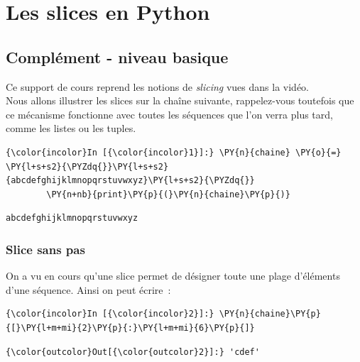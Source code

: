     \hypertarget{les-slices-en-python}{%
\section{Les slices en Python}\label{les-slices-en-python}}

    \hypertarget{compluxe9ment---niveau-basique}{%
\subsection{Complément - niveau
basique}\label{compluxe9ment---niveau-basique}}

    Ce support de cours reprend les notions de \emph{slicing} vues dans la
vidéo.\\

    Nous allons illustrer les slices sur la chaîne suivante, rappelez-vous
toutefois que ce mécanisme fonctionne avec toutes les séquences que l'on
verra plus tard, comme les listes ou les tuples.

    \begin{Verbatim}[commandchars=\\\{\}]
{\color{incolor}In [{\color{incolor}1}]:} \PY{n}{chaine} \PY{o}{=} \PY{l+s+s2}{\PYZdq{}}\PY{l+s+s2}{abcdefghijklmnopqrstuvwxyz}\PY{l+s+s2}{\PYZdq{}}
        \PY{n+nb}{print}\PY{p}{(}\PY{n}{chaine}\PY{p}{)}
\end{Verbatim}


    \begin{Verbatim}[commandchars=\\\{\}]
abcdefghijklmnopqrstuvwxyz
    \end{Verbatim}

    \hypertarget{slice-sans-pas}{%
\subsubsection{Slice sans pas}\label{slice-sans-pas}}

    On a vu en cours qu'une slice permet de désigner toute une plage
d'éléments d'une séquence. Ainsi on peut écrire~:

    \begin{Verbatim}[commandchars=\\\{\}]
{\color{incolor}In [{\color{incolor}2}]:} \PY{n}{chaine}\PY{p}{[}\PY{l+m+mi}{2}\PY{p}{:}\PY{l+m+mi}{6}\PY{p}{]}
\end{Verbatim}


\begin{Verbatim}[commandchars=\\\{\}]
{\color{outcolor}Out[{\color{outcolor}2}]:} 'cdef'
\end{Verbatim}
            
